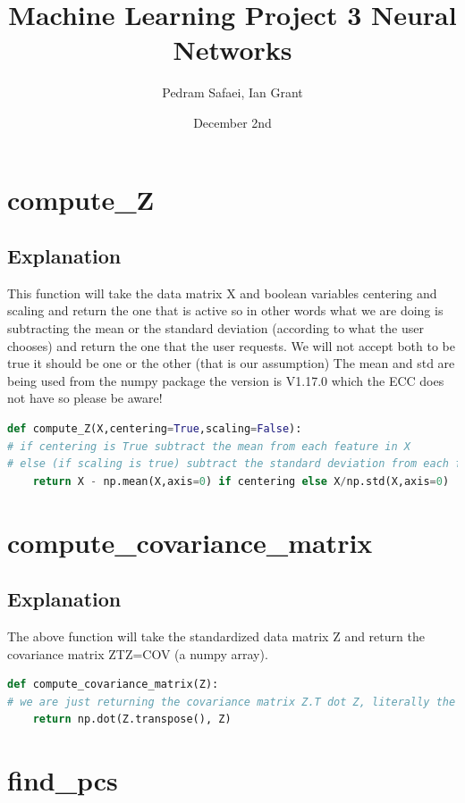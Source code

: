 \documentclass{article}
\title{Machine Learning Project 3 Neural Networks}
\author{Pedram Safaei, Ian Grant }
\date{December 2nd}
\begin{document}
\maketitle

\section{compute\_Z}
\subsection{Explanation}
This function will take the data matrix X and boolean variables centering and scaling and return the one that is active so in other words what we are doing is subtracting the mean or the standard deviation (according to what the user chooses) and return the one that the user requests. We  will not accept both to be true it should be one or the other (that is our assumption) The mean and std are being used from the numpy package the version is V1.17.0 which the ECC does not have so please be aware!

\begin{lstlisting}[language=Python]
def compute_Z(X,centering=True,scaling=False):
# if centering is True subtract the mean from each feature in X
# else (if scaling is true) subtract the standard deviation from each feature in X
	return X - np.mean(X,axis=0) if centering else X/np.std(X,axis=0)
\end{lstlisting}


\section{compute\_covariance\_matrix}
\subsection{Explanation}
The above function will take the standardized data matrix Z and return the covariance matrix ZTZ=COV (a numpy array).

\begin{lstlisting}[language=Python]
def compute_covariance_matrix(Z):
# we are just returning the covariance matrix Z.T dot Z, literally the easiest part of this project
	return np.dot(Z.transpose(), Z)
\end{lstlisting}

\section{find\_pcs}
\end{document}
